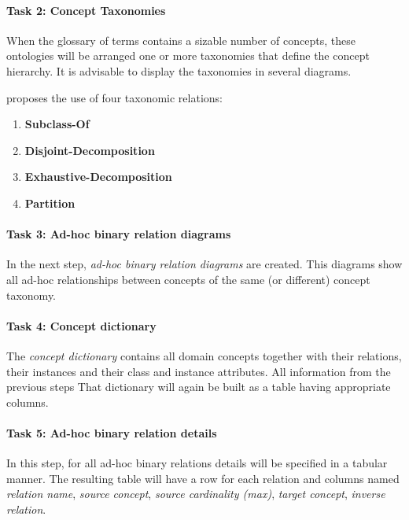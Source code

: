 \paragraph{Task 2: Concept Taxonomies}

When the glossary of terms contains a sizable number of concepts, these ontologies will be arranged one or more taxonomies that define the concept hierarchy. It is advisable to display the taxonomies in several diagrams.

\methontology proposes the use of four taxonomic relations:
\begin{enumerate}
  \item \textbf{Subclass-Of}
  \item \textbf{Disjoint-Decomposition}
  \item \textbf{Exhaustive-Decomposition}
  \item \textbf{Partition}
\end{enumerate}


\paragraph{Task 3: Ad-hoc binary relation diagrams}

In the next step, \emph{ad-hoc binary relation diagrams} are created. This diagrams show all ad-hoc relationships between concepts of the same (or different) concept taxonomy.


\paragraph{Task 4: Concept dictionary}

The \emph{concept dictionary} contains all domain concepts together with their relations, their instances and their class and instance attributes. All information from the previous steps That dictionary will again be built as a table having appropriate columns.


\paragraph{Task 5: Ad-hoc binary relation details}

In this step, for all ad-hoc binary relations details will be specified in a tabular manner. The resulting table will have a row for each relation and columns named \emph{relation name}, \emph{source concept}, \emph{source cardinality (max)}, \emph{target concept}, \emph{inverse relation}.

